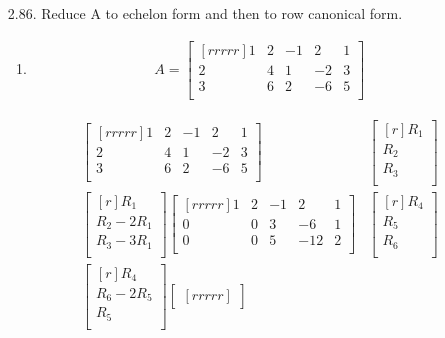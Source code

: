 \documentclass[12pt]{article}
\begin{document}
\begin{enumerate}
\item [2.86.] Reduce A to echelon form and then to row canonical form.
	\begin{enumerate}
	
	\item
	\begin{align*}
	A = 
	\begin{bmatrix}[rrrrr]
	1 & 2 & -1 & 2 & 1\\
	2 & 4 & 1 & -2 & 3\\
	3 & 6 & 2 & -6 & 5\\
	\end{bmatrix}
	\end{align*}
	
	\begin{align*}
	\begin{bmatrix}[rrrrr]
	1 & 2 & -1 & 2 & 1\\
	2 & 4 & 1 & -2 & 3\\
	3 & 6 & 2 & -6 & 5\\
	\end{bmatrix}&
	\begin{bmatrix}[r]
	R_1\\ R_2\\ R_3\\
	\end{bmatrix}\\
	\begin{bmatrix}[r]
	R_1\\	
	R_2 - 2R_1\\
	R_3 - 3R_1\\
	\end{bmatrix}
	\begin{bmatrix}[rrrrr]
	1 & 2 & -1 & 2 & 1\\
	0 & 0 & 3 & -6 & 1\\
	0 & 0 & 5 & -12 & 2\\
	\end{bmatrix}&
	\begin{bmatrix}[r]
	R_4\\ R_5\\ R_6\\
	\end{bmatrix}\\
	\begin{bmatrix}[r]
	R_4\\
	R_6-2R_5\\	
	R_5\\
	\end{bmatrix}
	\begin{bmatrix}[rrrrr]

\end{bmatrix}
\end{align*}
\end{enumerate}
\end{enumerate}
\end{document}
